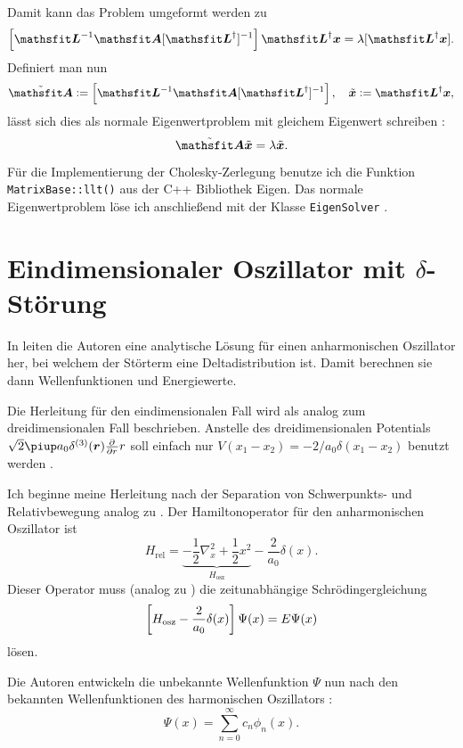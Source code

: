 Damit kann das Problem umgeformt werden zu \parencite[(3.31)]{MacKinnon/GEVP}
\[
    \sbr{\tens L^{-1} \tens A [\tens L^\dagger]^{-1}} \tens L^\dagger \vec x
    =
    \lambda [\tens L^\dagger \vec x].
\]
Definiert man nun
\[
    \tilde{\tens A} := \sbr{\tens L^{-1} \tens A [\tens L^\dagger]^{-1}}
    \eqnsep
    \tilde{\vec x} := \tens L^\dagger \vec x,
\]
lässt sich dies als normale Eigenwertproblem mit gleichem Eigenwert schreiben
\parencite[(3.32)]{MacKinnon/GEVP}:
\[
    \tilde{\tens A} \tilde{\vec x} = \lambda \tilde{\vec x}.
\]

Für die Implementierung der Cholesky-Zerlegung benutze ich die Funktion
\texttt{MatrixBase::llt()} \parencite{Eigen/LLT} aus der C++ Bibliothek Eigen.
Das normale Eigenwertproblem löse ich anschließend mit der Klasse
\texttt{EigenSolver} \parencite{Eigen/EigenSolver}.

\section{Eindimensionaler Oszillator mit \texorpdfstring{$\delta$}{delta}-Störung}


\newcommand\br[1]{\parencite[(#1)]{Busch/Two_Cold}}

In  leiten die Autoren eine analytische Lösung für
einen anharmonischen Oszillator her, bei welchem der Störterm eine
Deltadistribution ist. Damit berechnen sie dann Wellenfunktionen und
Energiewerte.

Die Herleitung für den eindimensionalen Fall wird als analog zum
dreidimensionalen Fall beschrieben. Anstelle des dreidimensionalen Potentials
$\sqrt 2 \piup a_0 \delta^{(3)}(\vec r) \pd{}r r$ soll einfach nur $V(x_1 -
x_2) = - 2/a_0 \delta(x_1 - x_2)$ benutzt werden
\parencite[Fußnote~20]{Busch/Two_Cold}.

Ich beginne meine Herleitung nach der Separation von Schwerpunkts- und
Relativbewegung analog zu \br2. Der Hamiltonoperator für den anharmonischen
Oszillator ist
\[
    H_\text{rel} = \underbrace{- \frac12 \nabla_x^2 + \frac 12
    x^2}_{H_\text{osz}} - \frac2{a_0} \delta(x).
\]
Dieser Operator muss (analog zu \br3) die zeitunabhängige Schrödingergleichung
\begin{equation}
    \label{eq:Bus_3}
    \sbr{H_\text{osz} - \frac2{a_0} \delta(x)} \Psi(x) = E \Psi(x)
\end{equation}
lösen.

Die Autoren entwickeln die unbekannte Wellenfunktion $\Psi$ nun nach den
bekannten Wellenfunktionen des harmonischen Oszillators \br4:
\[
    \Psi(x) = \sum_{n=0}^\infty c_n \phi_n(x).
\]

